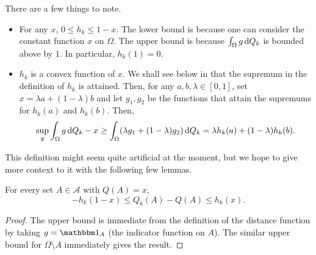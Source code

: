 There are a few things to note.
\begin{itemize}
	\item For any $x$, $0\leq h_k\leq 1-x$. The lower bound is because one can consider the constant function $x$ on $\Omega$. The upper bound is because $\int_\Omega g\operatorname{d}\!{Q}_k$ is bounded above by $1$. In particular, $h_k(1)=0$.
	\item $h_k$ is a convex function of $x$. We shall see below in  that the supremum in the definition of $h_k$ is attained. Then, for any $a,b,\lambda\in[0,1]$, set $x=\lambda a+(1-\lambda)b$ and let $g_1,g_2$ be the functions that attain the supremums for $h_k(a)$ and $h_k(b)$. Then,
	\[ \sup_g \int_\Omega g\operatorname{d}\!{Q}_k - x \geq \int_\Omega (\lambda g_1 + (1-\lambda)g_2) \operatorname{d}\!{Q}_k = \lambda h_k(a) + (1-\lambda) h_k(b). \]
\end{itemize}

This definition might seem quite artificial at the moment, but we hope to give more context to it with the following few lemmas.

\begin{lemma}
	For every set $A\in\mathcal{A}$ with $Q(A)=x$,
	\[ -h_k(1-x) \leq Q_k(A) - Q(A) \leq h_k(x). \]
\end{lemma}
\begin{proof}
	The upper bound is immediate from the definition of the distance function by taking $g = \indic_A$ (the indicator function on $A$). The similar upper bound for $\Omega\setminus A$ immediately gives the result.
\end{proof}

